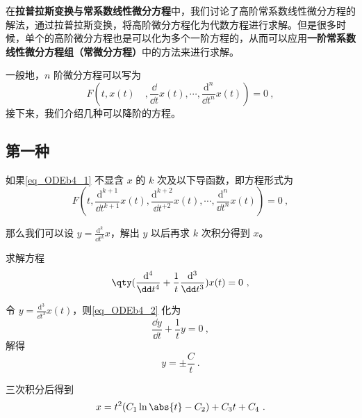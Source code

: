 

在\textbf{拉普拉斯变换与常系数线性微分方程}中，我们讨论了高阶常系数线性微分方程的解法，通过拉普拉斯变换，将高阶微分方程化为代数方程进行求解。但是很多时候，单个的高阶微分方程也是可以化为多个一阶方程的，从而可以应用\textbf{一阶常系数线性微分方程组（常微分方程）}中的方法来进行求解。

一般地，$n$ 阶微分方程可以写为
\begin{equation}\label{eq_ODEb4_1}
F(t, x(t)\quad, \frac{\dd}{\dd t}x(t), \cdots, \frac{\mathrm{d}^n}{\dd t^n}x(t))=0~,
\end{equation}
接下来，我们介绍几种可以降阶的方程。

\subsection{第一种}

如果\autoref{eq_ODEb4_1} 不显含 $x$ 的 $k$ 次及以下导函数，即方程形式为
\begin{equation}
F(t, \frac{\mathrm{d}^{k+1}}{\dd t^{k+1}}x(t), \frac{\mathrm{d}^{k+2}}{\dd t^{+2}}x(t), \cdots, \frac{\mathrm{d}^n}{\dd t^n}x(t))=0~,
\end{equation}

那么我们可以设 $y=\frac{\mathrm{d}^k}{\dd t^k}x$，解出 $y$ 以后再求 $k$ 次积分得到 $x$。


\begin{example}{}
求解方程
\begin{equation}\label{eq_ODEb4_2}
\qty(
    \frac{\mathrm{d}^4}{\dd t^4}+\frac{1}{t}\frac{\mathrm{d}^3}{\dd t^3}
    )
    x(t)=0~,
\end{equation}

令 $y=\frac{\mathrm{d}^3}{\dd t^3}x(t)$，则\autoref{eq_ODEb4_2} 化为
\begin{equation}
\frac{\dd y}{\dd t}+\frac{1}{t}y=0~,
\end{equation}
解得
\begin{equation}
y=\pm\frac{C}{t}~.
\end{equation}

三次积分后得到
\begin{equation}
x=t^2(C_1\ln\abs{t}-C_2)+C_3t+C_4~.
\end{equation}



\end{example}


